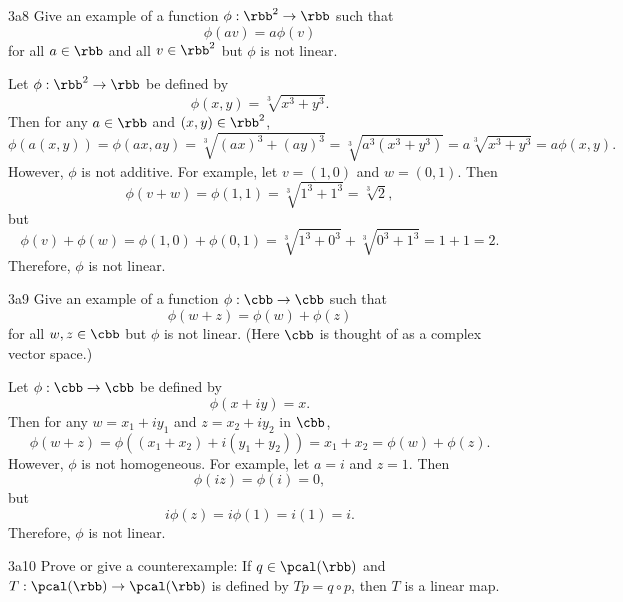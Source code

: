 \begin{exercise}{3a8}
    Give an example of a function $\phi: \rbb^2 \to \rbb$ such that
    \[
    	\phi(av) = a\phi(v)
    \]
    for all $a \in \rbb$ and all $v \in \rbb^2$ but $\phi$ is not linear.

\end{exercise}

\begin{sol}
    Let $\phi: \rbb^2 \to \rbb$ be defined by
    \[
    	\phi(x, y) = \sqrt[3]{x^3 + y^3}.
    \]
    Then for any $a \in \rbb$ and $(x, y) \in \rbb^2$,
    \[
    	\phi(a(x, y)) = \phi(ax, ay) = \sqrt[3]{(ax)^3 + (ay)^3} = \sqrt[3]{a^3(x^3 + y^3)} = a\sqrt[3]{x^3 + y^3} = a\phi(x, y).
    \]
    However, $\phi$ is not additive.
	For example, let $v = (1, 0)$ and $w = (0, 1)$.
	Then
    \[
    	\phi(v + w) = \phi(1, 1) = \sqrt[3]{1^3 + 1^3} = \sqrt[3]{2},
    \]
    but
    \[
    	\phi(v) + \phi(w) = \phi(1, 0) + \phi(0, 1) = \sqrt[3]{1^3 + 0^3} + \sqrt[3]{0^3 + 1^3} = 1 + 1 = 2.
    \]
    Therefore, $\phi$ is not linear.
\end{sol}

\begin{exercise}{3a9}
    Give an example of a function $\phi: \cbb \to \cbb$ such that
    \[
    	\phi(w + z) = \phi(w) + \phi(z)
    \]
    for all $w, z \in \cbb$ but $\phi$ is not linear. (Here $\cbb$ is thought of as a complex vector space.)
\end{exercise}

\begin{sol}
    Let $\phi: \cbb \to \cbb$ be defined by
    \[
    	\phi(x + iy) = x.
    \]
    Then for any $w = x_1 + iy_1$ and $z = x_2 + iy_2$ in $\cbb$,
    \[
    	\phi(w + z) = \phi((x_1 + x_2) + i(y_1 + y_2)) = x_1 + x_2 = \phi(w) + \phi(z).
    \]
    However, $\phi$ is not homogeneous.
	For example, let $a = i$ and $z = 1$.
	Then
    \[
    	\phi(iz) = \phi(i) = 0,
    \]
    but
    \[
    	i\phi(z) = i\phi(1) = i(1) = i.
    \]
    Therefore, $\phi$ is not linear.
\end{sol}

\begin{exercise}{3a10}
    Prove or give a counterexample: If $q \in \pcal(\rbb)$ and $T: \pcal(\rbb) \to \pcal(\rbb)$ is defined by $Tp = q \circ p$, then $T$ is a linear map.
\end{exercise}

